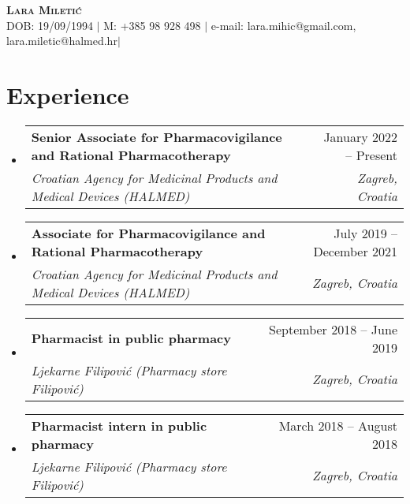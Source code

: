 \documentclass[letterpaper,11pt]{article}
\makeatletter
\newcommand{\resumeItem}[1]{
  \item\small{
    {#1 \vspace{-2pt}}
  }
}
\newcommand{\resumeSubheading}[4]{
  \vspace{-2pt}\item
    \begin{tabular*}{0.97\textwidth}[t]{l@{\extracolsep{\fill}}r}
      \textbf{#1} & #2 \\
      \textit{\small#3} & \textit{\small #4} \\
    \end{tabular*}\vspace{-7pt}
}
\newcommand{\resumeSubHeadingListStart}{\begin{itemize}[leftmargin=0.15in, label={}]}
\newcommand{\resumeSubHeadingListEnd}{\end{itemize}}
\newcommand{\resumeItemListStart}{\begin{itemize}}
\newcommand{\resumeItemListEnd}{\end{itemize}\vspace{-5pt}}
\makeatother
\begin{document}
\begin{center}
    \textbf{\Huge \scshape Lara Miletić} \\ \vspace{1pt}
    \small DOB: 19/09/1994 $|$
    \small M: +385 98 928 498 $|${ e-mail: lara.mihic@gmail.com, lara.miletic@halmed.hr}$|$

\end{center}
\section{{Experience}}
  \resumeSubHeadingListStart
      \resumeSubheading
      {{Senior Associate for Pharmacovigilance and Rational Pharmacotherapy}}{January 2022 -- Present}
      {Croatian Agency for Medicinal Products and Medical Devices (HALMED)}{Zagreb, Croatia}

    \resumeSubheading
      {{Associate for Pharmacovigilance and Rational Pharmacotherapy}}{July 2019 -- December 2021}
      {Croatian Agency for Medicinal Products and Medical Devices (HALMED)}{Zagreb, Croatia}
    
     \resumeSubheading
      {{Pharmacist in public pharmacy}}{September 2018 -- June 2019}
      {Ljekarne Filipović (Pharmacy store Filipović)}{Zagreb, Croatia}
      \resumeSubheading
      {{Pharmacist intern in public pharmacy}}{March 2018 -- August 2018}
      {Ljekarne Filipović (Pharmacy store Filipović)}{Zagreb, Croatia}
  \resumeSubHeadingListEnd
\end{document}
